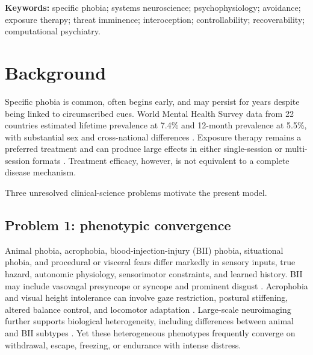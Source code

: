 \documentclass[11pt]{article}
\begin{document}
\begin{abstract}
\textbf{Predictions:} RRHM predicts that defensive transition will occur earlier when estimated eRRH contracts even when objective threat, physical threat imminence, uncertainty, perceived control, escape availability, and action number are matched. A shared eRRH parameter should improve prediction of transition timing across animal, natural-environment, blood-injection-injury, situational, and procedural/visceral phobias despite subtype-specific autonomic and sensorimotor outputs.

\textbf{Conclusions:} RRHM is an experiment-ready medical-science hypothesis rather than an established mechanism. Its scientific status depends on independent measurement, parameter identifiability, causal manipulation, cross-phobia replication, prospective prediction, and superior held-out performance over preregistered rival models.
\end{abstract}

\noindent\textbf{Keywords:} specific phobia; systems neuroscience; psychophysiology; avoidance; exposure therapy; threat imminence; interoception; controllability; recoverability; computational psychiatry.

\section{Background}
Specific phobia is common, often begins early, and may persist for years despite being linked to circumscribed cues. World Mental Health Survey data from 22 countries estimated lifetime prevalence at 7.4\% and 12-month prevalence at 5.5\%, with substantial sex and cross-national differences \cite{wardenaar2017}. Exposure therapy remains a preferred treatment and can produce large effects in either single-session or multi-session formats \cite{odgers2022}. Treatment efficacy, however, is not equivalent to a complete disease mechanism.

Three unresolved clinical-science problems motivate the present model.

\subsection{Problem 1: phenotypic convergence}
Animal phobia, acrophobia, blood-injection-injury (BII) phobia, situational phobia, and procedural or visceral fears differ markedly in sensory inputs, true hazard, autonomic physiology, sensorimotor constraints, and learned history. BII may include vasovagal presyncope or syncope and prominent disgust \cite{ducasse2013,ayala2009,ritz2010}. Acrophobia and visual height intolerance can involve gaze restriction, postural stiffening, altered balance control, and locomotor adaptation \cite{huppert2020,wuehr2015}. Large-scale neuroimaging further supports biological heterogeneity, including differences between animal and BII subtypes \cite{hilbert2024}. Yet these heterogeneous phenotypes frequently converge on withdrawal, escape, freezing, or endurance with intense distress.
\end{document}
